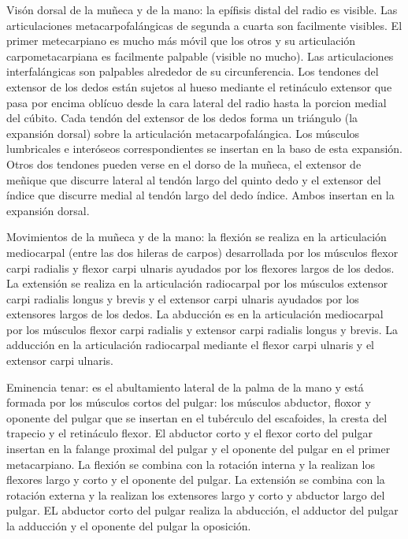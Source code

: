Visón dorsal de la muñeca y de la mano: la epífisis distal del radio es visible. Las articulaciones metacarpofalángicas de segunda a cuarta son facilmente visibles. El primer metecarpiano es mucho más móvil que los otros y su articulación carpometacarpiana es facilmente palpable (visible no mucho). Las articulaciones interfalángicas son palpables alrededor de su circunferencia.
Los tendones del extensor de los dedos están sujetos al hueso mediante el retináculo extensor que pasa por encima oblícuo desde la cara lateral del radio hasta la porcion medial del cúbito. Cada tendón del extensor de los dedos forma un triángulo (la expansión dorsal) sobre la articulación metacarpofalángica. Los músculos lumbricales e interóseos correspondientes se insertan en la baso de esta expansión. Otros dos tendones pueden verse en el dorso de la muñeca, el extensor de meñique que discurre lateral al tendón largo del quinto dedo y el extensor del índice que discurre medial al tendón largo del dedo índice. Ambos insertan en la expansión dorsal.

Movimientos de la muñeca y de la mano: la flexión se realiza en la articulación mediocarpal (entre las dos hileras de carpos) desarrollada por los músculos flexor carpi radialis y flexor carpi ulnaris ayudados por los flexores largos de los dedos. La extensión se realiza en la articulación radiocarpal por los músculos extensor carpi radialis longus y brevis y el extensor carpi ulnaris ayudados por los extensores largos de los dedos. La abducción es en la articulación mediocarpal por los músculos flexor carpi radialis y extensor carpi radialis longus y brevis. La adducción en la articulación radiocarpal mediante el flexor carpi ulnaris y el extensor carpi ulnaris.

Eminencia tenar: es el abultamiento lateral de la palma de la mano y está formada por los músculos cortos del pulgar: los músculos abductor, floxor y oponente del pulgar que se insertan en el tubérculo del escafoides, la cresta del trapecio y el retináculo flexor. El abductor corto y el flexor corto del pulgar insertan en la falange proximal del pulgar y el oponente del pulgar en el primer metacarpiano.
La flexión se combina con la rotación interna y la realizan los flexores largo y corto y el oponente del pulgar. La extensión se combina con la rotación externa y la realizan los extensores largo y corto y abductor largo del pulgar. EL abductor corto del pulgar realiza la abducción, el adductor del pulgar la adducción y el oponente del pulgar la oposición.

